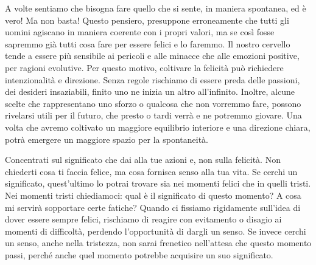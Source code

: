 \documentclass[12pt]{book} %
\begin{document}
A volte sentiamo che bisogna fare quello che si sente, in maniera spontanea, ed è vero! Ma non basta! Questo pensiero,
presuppone erroneamente che tutti gli uomini agiscano in maniera coerente con i propri valori, ma se così fosse sapremmo
già tutti cosa fare per essere felici e lo faremmo. Il nostro cervello tende a essere più sensibile ai pericoli e alle minacce che alle emozioni positive, per ragioni evolutive. Per questo motivo, coltivare la felicità può richiedere intenzionalità e direzione. Senza regole rischiamo di essere preda delle passioni, dei desideri insaziabili, finito uno ne inizia un altro all'infinito. Inoltre, alcune scelte che rappresentano
uno sforzo o qualcosa che non vorremmo fare, possono rivelarsi utili per il futuro, che presto o tardi verrà e ne
potremmo giovare. Una volta che avremo coltivato un maggiore equilibrio interiore e una direzione chiara, potrà emergere un maggiore spazio per la spontaneità.

Concentrati sul significato che dai alla tue azioni e, non sulla felicità. Non chiederti cosa ti faccia felice, ma cosa
fornisca senso alla tua vita.
Se cerchi un significato, quest'ultimo lo potrai trovare sia nei momenti felici che in quelli tristi. Nei momenti tristi chiediamoci: qual è il significato di questo momento? A cosa mi servirà sopportare certe fatiche?
Quando ci fissiamo rigidamente sull’idea di dover essere sempre felici, rischiamo di reagire con evitamento o disagio ai momenti di difficoltà, perdendo l’opportunità di dargli un senso.
Se invece cerchi un senso, anche nella tristezza, non sarai frenetico nell'attesa che questo momento passi, perché anche quel momento potrebbe acquisire un suo significato.
\end{document}
